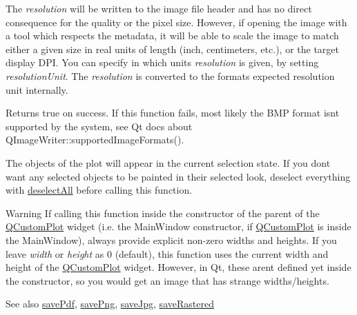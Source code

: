 The {\itshape resolution} will be written to the image file header and has no direct consequence for the quality or the pixel size. However, if opening the image with a tool which respects the metadata, it will be able to scale the image to match either a given size in real units of length (inch, centimeters, etc.), or the target display D\+PI. You can specify in which units {\itshape resolution} is given, by setting {\itshape resolution\+Unit}. The {\itshape resolution} is converted to the format\textquotesingle{}s expected resolution unit internally.

Returns true on success. If this function fails, most likely the B\+MP format isn\textquotesingle{}t supported by the system, see Qt docs about Q\+Image\+Writer\+::supported\+Image\+Formats().

The objects of the plot will appear in the current selection state. If you don\textquotesingle{}t want any selected objects to be painted in their selected look, deselect everything with \hyperlink{class_q_custom_plot_a9d4808ab925b003054085246c92a257c}{deselect\+All} before calling this function.

\begin{DoxyWarning}{Warning}
If calling this function inside the constructor of the parent of the \hyperlink{class_q_custom_plot}{Q\+Custom\+Plot} widget (i.\+e. the Main\+Window constructor, if \hyperlink{class_q_custom_plot}{Q\+Custom\+Plot} is inside the Main\+Window), always provide explicit non-\/zero widths and heights. If you leave {\itshape width} or {\itshape height} as 0 (default), this function uses the current width and height of the \hyperlink{class_q_custom_plot}{Q\+Custom\+Plot} widget. However, in Qt, these aren\textquotesingle{}t defined yet inside the constructor, so you would get an image that has strange widths/heights.
\end{DoxyWarning}
\begin{DoxySeeAlso}{See also}
\hyperlink{class_q_custom_plot_ad5acd34f6b39c3516887d7e54fec2412}{save\+Pdf}, \hyperlink{class_q_custom_plot_ac92cc9256d12f354b40a4be4600b5fb9}{save\+Png}, \hyperlink{class_q_custom_plot_a76f0d278e630a711fa6f48048cfd83e4}{save\+Jpg}, \hyperlink{class_q_custom_plot_ad7723ce2edfa270632ef42b03a444352}{save\+Rastered} 
\end{DoxySeeAlso}
